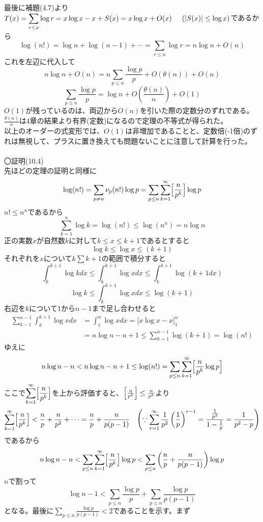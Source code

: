 \documentclass{jsarticle}
\begin{document}
最後に補題(4.7)より\(\displaystyle T(x)=\sum_{r\leq x}\log r=x\log x-x+S(x)=x\log x+O(x)\hspace{5mm}(|S(x)|\leq\log x)\)であるから
\[\log(n!)=\log n+\log(n-1)+\cdots=\sum_{r\leq n}\log r=n\log n+O(n)\]
これを左辺に代入して
\[n\log n+O(n)=n\sum_{p\leq n}\frac{\log p}{p}+O\left(\theta(n)\right)+O(n)\]
\[\sum_{p\leq n}\frac{\log p}{p}=\log n+O\left(\frac{\theta(n)}{n}\right)+O(1)\]
\(O(1)\)が残っているのは、両辺から\(O(n)\)を引いた際の定数分のずれである。\\
\(\frac{\theta(n)}{n}\)は4章の結果より有界(定数)になるので定理の不等式が得られた。\\
以上のオーダーの式変形では、\(O(1)\)は非増加であることと、定数倍(-1倍)のずれは無視して、プラスに置き換えても問題ないことに注意して計算を行った。\\
\\
〇証明(10.4)\\
先ほどの定理の証明と同様に
\[\log(n!)=\sum_{p\neq n}\nu_{p}(n!)\log p=\sum_{p\leq n}\sum_{k=1}^{\infty}\Bigl[\frac{n}{p^{k}}\Bigr]\log p\]
\(n!\leq n^n\)であるから
\[\sum_{k=1}^{n}\log k=\log(n!)\leq\log(n^n)=n\log n\]
正の実数\(x\)が自然数\(k\)に対して\(k\leq x\leq k+1\)であるとすると
\[\log k\leq \log x\leq(k+1)\]
それぞれを\(x\)について\(k\sum k+1\)の範囲で積分すると
\[\int_{k}^{k+1}\log kdx\leq\int_{k}^{k+1}\log xdx\leq\int_{k}^{k+1}\log(k+1dx)\]
\[\log k\leq\int_{k}^{k+1}\log xdx\leq\log(k+1)\]
右辺を\(k\)について1から\(n-1\)まで足し合わせると
\begin{align*}
\sum_{k-1}^{n-1}\int_{k}^{k+1}\log xdx&=\int_{1}^{n}\log xdx=\Bigr[x\log x-x\Bigr]_{1}^{n}\\
&=n\log n-n+1\leq\sum_{k=1}^{n-1}\log(k+1)=\log(n!)
\end{align*}
ゆえに
\[n\log n-n<n\log n-n+1\leq\log(n!)=\sum_{p\leq n}\sum_{k=1}^{\infty}\Bigl[\frac{n}{p^{k}}\log p\Bigr]\]
ここで\(\displaystyle\sum_{k=1}^{\infty}\Bigl[\frac{n}{p^k}\Bigr]\)を上から評価すると、\(\Bigl[\frac{n}{p^k}\Bigr]\leq\frac{n}{p^k}\)より
\[\sum_{k=1}^{\infty}\Bigl[\frac{n}{p^k}\Bigr]<\frac{n}{p}+\frac{n}{p^2}+\cdots=\frac{n}{p}+\frac{n}{p(p-1)}\hspace{3mm}\left(\because\sum_{r=1}^{\infty}\frac{1}{p^2}\left(\frac{1}{p}\right)^{r-1}=\frac{\frac{1}{p^2}}{1-\frac{1}{p}}=\frac{1}{p^2-p}\right)\]
であるから
\[n\log n-n<\sum_{p\leq n}\sum_{k=1}^{\infty}\Bigl[\frac{n}{p^k}\Bigr]\log p<\sum_{p\leq n}\left(\frac{n}{p}+\frac{n}{p(p-1)}\right)\log p\]
\(n\)で割って
\[\log n-1<\sum_{p\leq n}\frac{\log p}{p}+\sum_{p\leq n}\frac{\log p}{p(p-1)}\]
となる。最後に\(\displaystyle\sum_{p\leq n}\frac{\log p}{p(p-1)}<2\)であることを示す。まず
\end{document}

